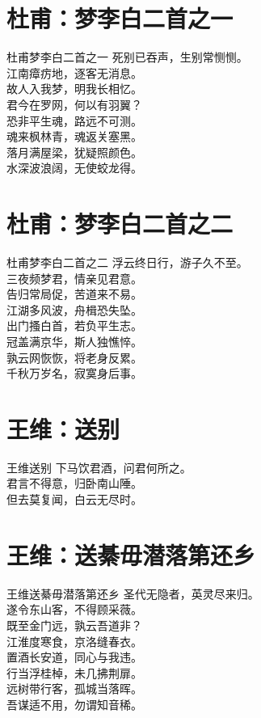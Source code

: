 \documentclass[12pt,oneside,a5paper]{book}
\begin{document}
\chapter{杜甫：梦李白二首之一}
\begin{poemzh}{杜甫}{梦李白二首之一}
死别已吞声，生别常恻恻。\\
江南瘴疠地，逐客无消息。\\
故人入我梦，明我长相忆。\\
君今在罗网，何以有羽翼？\\
恐非平生魂，路远不可测。\\
魂来枫林青，魂返关塞黑。\\
落月满屋梁，犹疑照颜色。\\
水深波浪阔，无使蛟龙得。\\ 
\end{poemzh}



\chapter{杜甫：梦李白二首之二}
\begin{poemzh}{杜甫}{梦李白二首之二}
浮云终日行，游子久不至。\\
三夜频梦君，情亲见君意。\\
告归常局促，苦道来不易。\\
江湖多风波，舟楫恐失坠。\\
出门搔白首，若负平生志。\\
冠盖满京华，斯人独憔悴。\\
孰云网恢恢，将老身反累。\\
千秋万岁名，寂寞身后事。\\
\end{poemzh}

\chapter{王维：送别}
\begin{poemzh}{王维}{送别}
下马饮君酒，问君何所之。\\
君言不得意，归卧南山陲。\\
但去莫复闻，白云无尽时。\\ 
\end{poemzh}

\chapter{王维：送綦毋潜落第还乡}
\begin{poemzh}{王维}{送綦毋潜落第还乡}
圣代无隐者，英灵尽来归。\\
遂令东山客，不得顾采薇。\\
既至金门远，孰云吾道非？\\
江淮度寒食，京洛缝春衣。\\
置酒长安道，同心与我违。\\
行当浮桂棹，未几拂荆扉。\\
远树带行客，孤城当落晖。\\
吾谋适不用，勿谓知音稀。\\ 
\end{poemzh}
\end{document}
